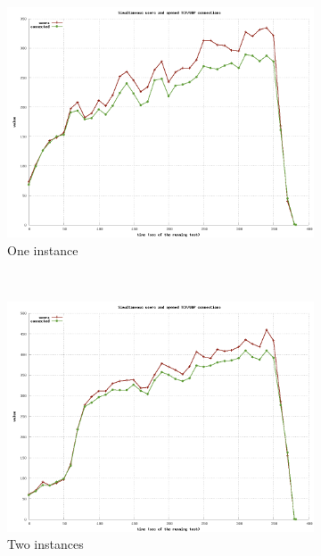 \documentclass[dvips,12pt]{article}
\begin{document}
\begin{figure}[h!]
    \centering
    \begin{subfigure}[b]{0.3\textwidth}
        \includegraphics[width=\textwidth]{images/horizontal_m3large_dbm3large/sim_users_1.png}
        \caption{One instance}
    \end{subfigure}
    ~ 
    \begin{subfigure}[b]{0.3\textwidth}
        \includegraphics[width=\textwidth]{images/horizontal_m3large_dbm3large/sim_users_2.png}
        \caption{Two instances}
    \end{subfigure}
    ~ 
    \begin{subfigure}[b]{0.3\textwidth}

\end{subfigure}
\end{figure}
\end{document}
